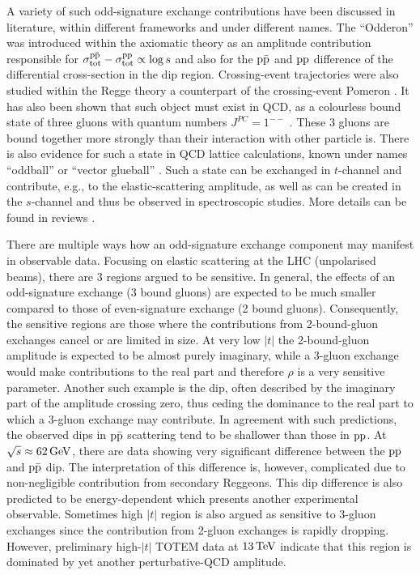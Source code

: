A variety of such odd-signature exchange contributions have been discussed in literature, within different frameworks and under different names. The ``Odderon'' was introduced within the axiomatic theory \cite{nicolescu-1990,nicolescu-2007} as an amplitude contribution responsible for $\sigma_{\rm tot}^{\rm p\bar p} - \sigma_{\rm tot}^{\rm pp} \propto \log s$ and also for the $\rm p\bar p$ and $\rm pp$ difference of the differential cross-section in the dip region. Crossing-event trajectories were also studied within the Regge theory a counterpart of the crossing-event Pomeron . It has also been shown that such object must exist in QCD, as a colourless bound state of three gluons with quantum numbers $J^{PC} = 1^{--}$ . These 3 gluons are bound together more strongly than their interaction with other particle is. There is also evidence for such a state in QCD lattice calculations, known under names ``oddball'' or ``vector glueball'' . Such a state can be exchanged in $t$-channel and contribute, e.g., to the elastic-scattering amplitude, as well as can be created in the $s$-channel and thus be observed in spectroscopic studies. More details can be found in reviews \cite{braun,ewerz}.

There are multiple ways how an odd-signature exchange component may manifest in observable data. Focusing on elastic scattering at the LHC (unpolarised beams), there are 3 regions argued to be sensitive. In general, the effects of an odd-signature exchange (3 bound gluons) are expected to be much smaller compared to those of even-signature exchange (2 bound gluons). Consequently, the sensitive regions are those where the contributions from 2-bound-gluon exchanges cancel or are limited in size. At very low $|t|$ the 2-bound-gluon amplitude is expected to be almost purely imaginary, while a 3-gluon exchange would make contributions to the real part and therefore $\rho$ is a very sensitive parameter. Another such example is the dip, often described by the imaginary part of the amplitude crossing zero, thus ceding the dominance to the real part to which a 3-gluon exchange may contribute. In agreement with such predictions, the observed dips in $\rm p\bar p$ scattering tend to be shallower than those in $\rm pp$. At $\sqrt s \approx 62\,{\rm GeV}$, there are data showing very significant difference between the $\rm pp$ and $\rm p\bar p$ dip. The interpretation of this difference is, however, complicated due to non-negligible contribution from secondary Reggeons. This dip difference is also predicted to be energy-dependent which presents another experimental observable. Sometimes high $|t|$ region is also argued as sensitive to 3-gluon exchanges since the contribution from 2-gluon exchanges is rapidly dropping. However, preliminary high-$|t|$ TOTEM data at $13\,{\rm TeV}$ indicate that this region is dominated by yet another perturbative-QCD amplitude.

